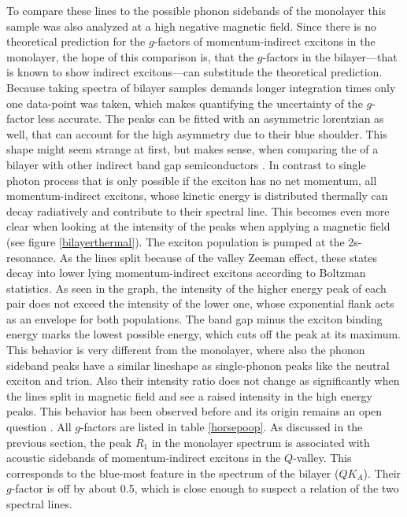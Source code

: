 To compare these lines to the possible phonon sidebands of the monolayer this sample was also analyzed at a high negative magnetic field. Since there is no theoretical prediction for the $g$-factors of momentum-indirect excitons in the monolayer, the hope of this comparison is, that the $g$-factors in the bilayer---that is known to show indirect excitons---can substitude the theoretical prediction. Because taking spectra of bilayer samples demands longer integration times only one data-point was taken, which makes quantifying the uncertainty of the $g$-factor less accurate. The peaks can be fitted with an asymmetric lorentzian as well, that can account for the high asymmetry due to their blue shoulder. This shape might seem strange at first, but makes sense, when comparing the \pl of a \wse bilayer with other indirect band gap semiconductors  \cite{pelant_luminescence_2012}. In contrast to single photon process that is only possible if the exciton has no net momentum, all momentum-indirect excitons, whose kinetic energy is distributed thermally can decay radiatively and contribute to their spectral line. This becomes even more clear when looking at the intensity of the peaks when applying a magnetic field (see figure \ref{bilayerthermal}). The exciton population is pumped at the 2s-resonance. As the lines split because of the valley Zeeman effect, these states decay into lower lying momentum-indirect excitons according to Boltzman statistics. As seen in the graph, the intensity of the higher energy peak of each pair does not exceed the intensity of the lower one, whose exponential flank acts as an envelope for both populations. The band gap minus the exciton binding energy marks the lowest possible energy, which cuts off the peak at its maximum. This behavior is very different from the monolayer, where also the phonon sideband peaks have a similar lineshape as single-phonon peaks like the neutral exciton and trion. Also their intensity ratio does not change as significantly when the lines split in magnetic field and see a raised intensity in the high energy peaks. This behavior has been observed before and its origin remains an open question \cite{koperski_optical_2017}. All $g$-factors are listed in table \ref{horsepoop}. As discussed in the previous section, the peak $R_1$ in the monolayer spectrum is associated with acoustic sidebands of momentum-indirect excitons in the $Q$-valley. This corresponds to the blue-most feature in the spectrum of the bilayer ($QK_A$). Their $g$-factor is off by about 0.5, which is close enough to suspect a relation of the two spectral lines.

